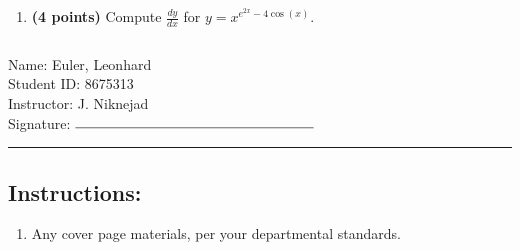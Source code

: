 \documentclass[12pt]{amsart}
\begin{document}
\begin{enumerate}
\vfill 
\def \varexp{2}\def \newexp{1}\def \trigcoeff{-4}\def \trigval{-4}\def \oppval{+4}
\item {\bf (4 points)} 
 Compute $\frac{dy}{dx}$ for $y=x^{e^{\varexp x} \trigval \cos(x)}$.

\vfill 
\newpage  $ $   \newpage\end{enumerate}\graphicspath{{C:/Users/iainc/anaconda3/Randomizer/MATH 1001/Midterm 1/}}\setcounter{page}{1}


\thispagestyle{fancy}

 \noindent Name: Euler, Leonhard \vspace{.3cm} \\\noindent Student ID: 8675313 \vspace{.3cm} \\\noindent Instructor: J. Niknejad \vspace{.3cm} \\\noindent Signature: $\rule{6cm}{0.15mm}$ \vspace{.3cm} \\ 



\vspace{.4cm}


\vspace{.4cm}

\hrule

\subsection*{Instructions:} \begin{enumerate}[1.]
\item Any cover page materials, per your departmental standards.
\end{enumerate}
\end{document}
